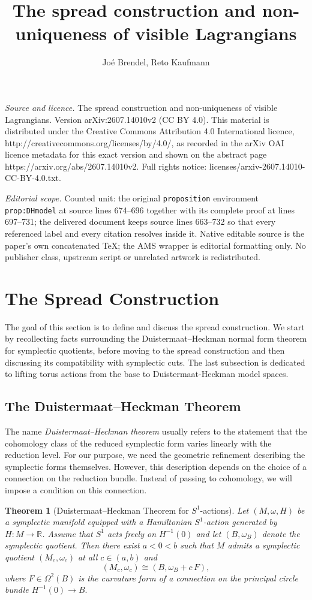 \documentclass[10pt,a4paper]{amsart}
\newtheorem{theorem}{Theorem}[section]
\newcommand{\IR}{\mathbb{R}}
\begin{document}
\title[The spread construction and non-uniqueness of visible Lagran]{The spread construction and non-uniqueness of visible Lagrangians}
\author{Joé Brendel, Reto Kaufmann}
\date{}
\maketitle
\noindent\emph{Source and licence.} The spread construction and non-uniqueness of visible Lagrangians. Version arXiv:2607.14010v2 (CC BY 4.0). This material is distributed under the Creative Commons Attribution 4.0 International licence, http://creativecommons.org/licenses/by/4.0/, as recorded in the arXiv OAI licence metadata for this exact version and shown on the abstract page https://arxiv.org/abs/2607.14010v2. Full rights notice: licenses/arxiv-2607.14010-CC-BY-4.0.txt.\par\smallskip
\noindent\textit{Editorial scope.} Counted unit: the original \texttt{proposition} environment \texttt{prop:DHmodel} at source lines 674--696 together with its complete proof at lines 697--731; the delivered document keeps source lines 663--732 so that every referenced label and every citation resolves inside it. Native editable source is the paper's own concatenated TeX; the AMS wrapper is editorial formatting only. No publisher class, upstream script or unrelated artwork is redistributed.
\section{The Spread Construction} \label{sec:spreadconstruction} 
The goal of this section is to define and discuss the spread construction. We start by recollecting facts surrounding the Duistermaat--Heckman normal form theorem for symplectic quotients, before moving to the spread construction and then discussing its compatibility with symplectic cuts. The last subsection is dedicated to lifting torus actions from the base to Duistermaat-Heckman model spaces.

\subsection{The Duistermaat--Heckman Theorem}
The name \emph{Duistermaat--Heckman theorem} usually refers to the statement that the cohomology class of the reduced symplectic form varies linearly with the reduction level. For our purpose, we need the geometric refinement describing the symplectic forms themselves. However, this description depends on the choice of a connection on the reduction bundle. Instead of passing to cohomology, we will impose a condition on this connection. 
\begin{theorem}[Duistermaat--Heckman Theorem for $S^1$-actions]
    Let $(M,\omega,H)$ be a symplectic manifold equipped with a Hamiltonian $S^1$-action generated by $H:M\to \IR$. Assume that $S^1$ acts freely on $H^{-1}(0)$ and let $(B,\omega_B)$ denote the symplectic quotient. Then there exist $a<0<b$ such that $M$ admits a symplectic quotient $(M_c,\omega_c)$ at all $c\in (a,b)$ and $$(M_c,\omega_c)\cong (B,\omega_B + c\, F),$$ where $F\in \Omega^2(B)$ is the curvature form of a connection on the principal circle bundle $H^{-1}(0) \to B.$
\end{theorem}
\end{document}
